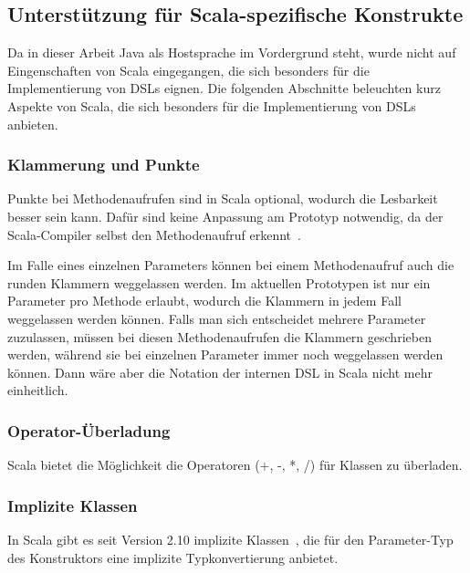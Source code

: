 \documentclass[../InterneDSLs.tex]{subfiles}
\begin{document}
\subsection{Unterstützung für Scala-spezifische Konstrukte}
Da in dieser Arbeit Java als Hostsprache im Vordergrund steht, wurde nicht auf Eingenschaften von Scala eingegangen, die sich besonders für die Implementierung von DSLs eignen. Die folgenden Abschnitte beleuchten kurz Aspekte von Scala, die sich besonders für die Implementierung von DSLs anbieten.

\subsubsection{Klammerung und Punkte}
Punkte bei Methodenaufrufen sind in Scala optional, wodurch die Lesbarkeit besser sein kann. Dafür sind keine Anpassung am Prototyp notwendig, da der Scala-Compiler selbst den Methodenaufruf erkennt~\cite{methodinvocation.scaladoc}.

Im Falle eines einzelnen Parameters können bei einem Methodenaufruf auch die runden Klammern weggelassen werden. Im aktuellen Prototypen ist nur ein Parameter pro Methode erlaubt, wodurch die Klammern in jedem Fall weggelassen werden können. Falls man sich entscheidet mehrere Parameter zuzulassen, müssen bei diesen Methodenaufrufen die Klammern geschrieben werden, während sie bei einzelnen Parameter immer noch weggelassen werden können. Dann wäre aber die Notation der internen DSL in Scala nicht mehr einheitlich.

\subsubsection{Operator-Überladung}
Scala bietet die Möglichkeit die Operatoren (+, -, *, /) für Klassen zu überladen.

\subsubsection{Implizite Klassen}
In Scala gibt es seit Version 2.10 implizite Klassen~\cite{implicitclasses.scaladoc}, die für den Parameter-Typ des Konstruktors eine implizite Typkonvertierung anbietet.
\end{document}
